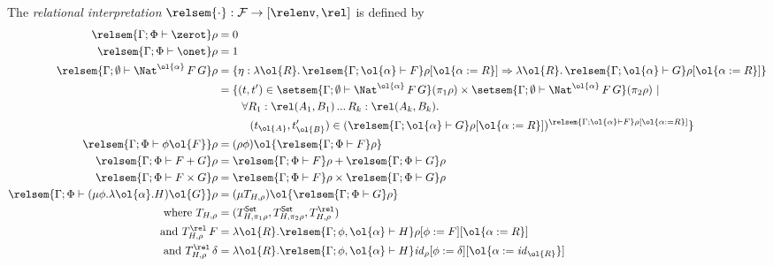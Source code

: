 \documentclass{lmcs}
\theoremstyle{plain}\newtheorem{satz}[thm]{Satz}
\newcommand{\F}{\mathcal{F}}
\newcommand{\set}{\mathsf{Set}}
\renewcommand{\id}{\mathit{id}}
\begin{document}
\begin{defi}\label{def:rel-sem}
The {\em relational interpretation} $\relsem{\cdot} : \F \to [\relenv,
 \rel]$ is defined by
\begin{align*}
  \relsem{\Gamma;\Phi \vdash \zerot}\rho &= 0\\
  \relsem{\Gamma;\Phi \vdash \onet}\rho &= 1\\
  \relsem{\Gamma; \emptyset \vdash \Nat^{\ol{\alpha}} \,F\,G}\rho &= \{\eta
  : \lambda \ol{R}.\,\relsem{\Gamma; \ol{\alpha} \vdash
    F}\rho[\ol{\alpha := R}] \Rightarrow \lambda \ol{R}. \,\relsem{
    \Gamma; \ol{\alpha} \vdash G}\rho[\ol{\alpha := R}]\}\\
  &=
  \{(t,t') \in \setsem{\Gamma; \emptyset
    \vdash \Nat^{\ol{\alpha}}
    \,F\,G} (\pi_1 \rho) \times \setsem{ 
    \Gamma;\emptyset
    \vdash \Nat^{\ol{\alpha}} \,F\,G} (\pi_2
  \rho)~|~\\ 
  & \hspace{0.3in} \forall {R_1 : \rel(A_1,B_1)}\,...\,{R_k : \rel(A_k,B_k)}.\\
  & \hspace{0.4in} (t_{\ol{A}},t'_{\ol{B}}) \in
  (\relsem{\Gamma; \ol{\alpha} \vdash G}\rho[\ol{\alpha :=
      R}])^{\relsem{\Gamma;\ol{\alpha}\vdash F}\rho[\ol{\alpha := R}]} \}\\  
  \relsem{\Gamma;\Phi \vdash \phi \ol{F}}\rho &=
  (\rho\phi)\ol{\relsem{\Gamma;\Phi \vdash 
    F}\rho}\\
  \relsem{\Gamma;\Phi \vdash F+G}\rho &=
  \relsem{\Gamma;\Phi \vdash F}\rho +
  \relsem{\Gamma;\Phi \vdash G}\rho\\
  \relsem{\Gamma;\Phi \vdash F\times G}\rho &=
  \relsem{\Gamma;\Phi \vdash F}\rho \times
  \relsem{\Gamma;\Phi \vdash G}\rho\\  
   \relsem{\Gamma;\Phi \vdash (\mu \phi.\lambda
    \ol{\alpha}. H)\ol{G}}\rho
  &= (\mu T_{H,\rho})\ol{\relsem{\Gamma;\Phi \vdash G}\rho}\\
  \text{where }	T_{H,\rho}
    &= (T^\set_{H,\pi_1\rho}, T^\set_{H,\pi_2\rho}, T^\rel_{H,\rho}) \\
  \text{and } T^\rel_{H,\rho}\,F
    &= \lambda \ol{R}. \relsem{
      \Gamma;\phi,\ol{\alpha} \vdash H}\rho[\phi :=
    F][\ol{\alpha := R}]\\
  \text{and } T^\rel_{H,\rho}\,\delta
    &= \lambda \ol{R}. \relsem{
      \Gamma;\phi,\ol{\alpha} \vdash H}\id_\rho[\phi :=
    \delta][\ol{\alpha := \id_{\ol{R}}}]
\end{align*}
\end{defi}
\end{document}
